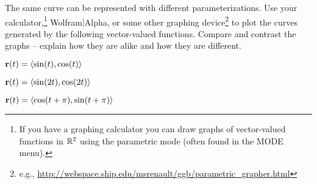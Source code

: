 \begin{activity} \label{A:9.6.1} The same curve can be represented
  with different parameterizations. Use your calculator,\footnote{If
    you have a graphing calculator you can draw graphs of
    vector-valued functions in $\mathbb{R}^2$ using the parametric mode (often
    found in the MODE menu).} Wolfram$\mid$Alpha, or some other
  graphing device\footnote{e.g.,
    \url{http://webspace.ship.edu/msrenault/ggb/parametric_grapher.html}}
  to plot the curves generated by the following vector-valued functions. Compare and contrast the graphs -- explain
  how they are alike and how they are different.  \ba
    \item $\mathbf{r}(t) = \langle \sin(t), \cos(t) \rangle$



    \item $\mathbf{r}(t) = \langle \sin(2t), \cos(2t) \rangle$



    \item $\mathbf{r}(t) = \langle \cos(t+\pi), \sin(t+\pi) \rangle$



    \ea

\end{activity}
\begin{smallhint}

\end{smallhint}
\begin{bighint}

\end{bighint}
